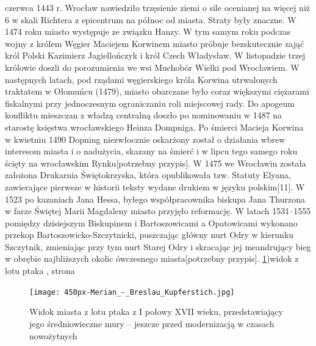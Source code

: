 \documentclass{article}
\begin{document}
\vspace{3mm} %
 czerwca 1443 r. Wrocław nawiedziło trzęsienie ziemi o sile ocenianej na więcej niż 6 w skali Richtera z epicentrum na północ od miasta. Straty były znaczne.
\vspace{3mm} %
\newline W 1474 roku miasto występuje ze związku Hanzy. W tym samym roku podczas wojny z królem Węgier Maciejem Korwinem miasto próbuje bezskutecznie zająć król Polski Kazimierz Jagiellończyk i król Czech Władysław. W listopadzie trzej królowie doszli do porozumienia we wsi Muchobór Wielki pod Wrocławiem. W następnych latach, pod rządami węgierskiego króla Korwina utrwalonych traktatem w Ołomuńcu (1479), miasto obarczane było coraz większymi ciężarami fiskalnymi przy jednoczesnym ograniczaniu roli miejscowej rady. Do apogeum konfliktu mieszczan z władzą centralną doszło po nominowaniu w 1487 na starostę księstwa wrocławskiego Heinza Dompniga. Po śmierci Macieja Korwina w kwietniu 1490 Dopning niezwłocznie oskarżony został o działania wbrew interesom miasta i o nadużycia, skazany na śmierć i w lipcu tego samego roku ścięty na wrocławskim Rynku[potrzebny przypis].
\vspace{3mm} %
\newline W 1475 we Wrocławiu została założona Drukarnia Świętokrzyska, która opublikowała tzw. Statuty Elyana, zawierające pierwsze w historii teksty wydane drukiem w języku polskim[11].
\vspace{3mm} %
\newline W 1523 po kazaniach Jana Hessa, byłego współpracownika biskupa Jana Thurzona w farze Świętej Marii Magdaleny miasto przyjęło reformację.
\vspace{3mm}
\newline W latach 1531–1555 pomiędzy dzisiejszym Biskupinem i Bartoszowicami a Opatowicami wykonano przekop Bartoszowicko-Szczytnicki, puszczając główny nurt Odry w kierunku Szczytnik, zmieniając przy tym nurt Starej Odry i skracając jej meandrujący bieg w obrębie najbliższych okolic ówczesnego miasta[potrzebny przypis].
\newline\ref{fig:lotptaka})widok z lotu ptaka , strona \pageref{fig:lotptaka}
\begin{figure}[h!]
\centering
\texttt{[image: 450px-Merian\_-\_Breslau\_Kupferstich.jpg]}
\caption{Widok miasta z lotu ptaka z I połowy XVII wieku, przedstawiający jego średniowieczne mury – jeszcze przed modernizacją w czasach nowożytnych}
\label{fig:lotptaka}
\end{figure}
\end{document}
